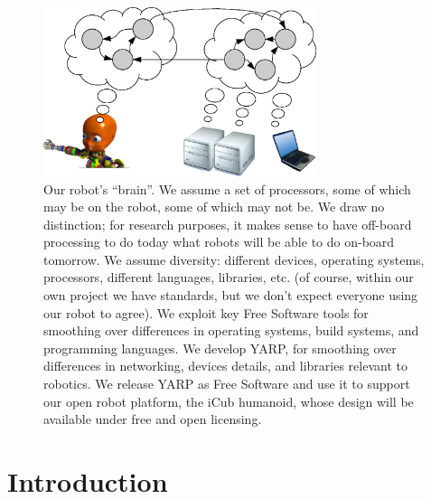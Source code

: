 

\begin{figure}
\centerline{
\includegraphics[width=8cm]{fig-nethead}
}
\caption{
%
Our robot's ``brain''.
We assume a set of processors, some of which may
be on the robot, some of which may not be. We draw no 
distinction; for research purposes, it makes sense to
have off-board processing to do today what robots will
be able to do on-board tomorrow.
%
We assume diversity:
different devices, operating systems, processors, different languages,
libraries, etc. (of course, within our own project we have standards,
but we don't expect everyone using our robot to agree).
%
%
We exploit key Free Software tools for smoothing over differences in
operating systems, build systems, and programming languages.
%
We develop YARP, for smoothing over differences in networking,
devices details, and libraries relevant to robotics.
%
%
%
%
We release YARP as Free Software
 and use it to support our open robot
platform, the iCub humanoid, whose design will be available under free
and open licensing.
%
}
\end{figure}


\section{Introduction}



